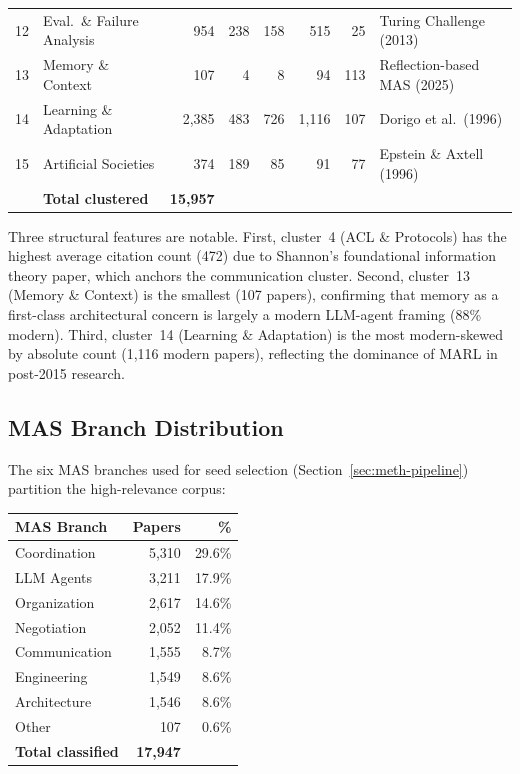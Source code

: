\documentclass{article}
\begin{document}
\begin{table}[t]
\begin{tabular}{@{} r p{3.8cm} r r r r r p{4cm} @{}}
12 & Eval.\ \& Failure Analysis    & 954   & 238   & 158 & 515  & 25  & Turing Challenge (2013) \\
13 & Memory \& Context             & 107   & 4     & 8   & 94   & 113 & Reflection-based MAS (2025) \\
14 & Learning \& Adaptation        & 2,385 & 483   & 726 & 1,116 & 107 & Dorigo et al.\ (1996) \\
15 & Artificial Societies          & 374   & 189   & 85  & 91   & 77  & Epstein \& Axtell (1996) \\
\midrule
   & \textbf{Total clustered}      & \textbf{15,957} & & & & & \\
\bottomrule
\end{tabular}
\end{table}

\noindent
Three structural features are notable. First, cluster~4 (ACL \& Protocols) has the
highest average citation count (472) due to Shannon's foundational information theory
paper, which anchors the communication cluster. Second, cluster~13 (Memory \& Context)
is the smallest (107 papers), confirming that memory as a first-class architectural
concern is largely a modern LLM-agent framing (88\% modern). Third, cluster~14
(Learning \& Adaptation) is the most modern-skewed by absolute count (1,116 modern
papers), reflecting the dominance of MARL in post-2015 research.

\subsection{MAS Branch Distribution}

The six MAS branches used for seed selection (Section~\ref{sec:meth-pipeline})
partition the high-relevance corpus:

\begin{center}
\small
\begin{tabular}{@{} l r r @{}}
\toprule
\textbf{MAS Branch} & \textbf{Papers} & \textbf{\%} \\
\midrule
Coordination      & 5,310 & 29.6\% \\
LLM Agents        & 3,211 & 17.9\% \\
Organization      & 2,617 & 14.6\% \\
Negotiation       & 2,052 & 11.4\% \\
Communication     & 1,555 & 8.7\%  \\
Engineering       & 1,549 & 8.6\%  \\
Architecture      & 1,546 & 8.6\%  \\
Other             & 107   & 0.6\%  \\
\midrule
\textbf{Total classified} & \textbf{17,947} & \\
\bottomrule
\end{tabular}
\end{center}
\end{document}
